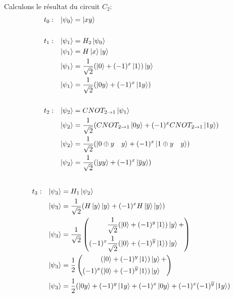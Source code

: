 \documentclass{article}
\begin{document}
Calculons le résultat du circuit $C_2$:
\begin{align*}
&t_0:&  \ket{\psi_0} &= \ket{xy} \\ \\
&t_1:&  \ket{\psi_1} &= H_2\ket{\psi_0} \\
&&      \ket{\psi_1} &= H\ket{x}\ket{y} \\
&&      \ket{\psi_1} &= \frac{1}{\sqrt{2}}(\ket{0} + (-1)^x\ket{1})\ket{y} \\
&&      \ket{\psi_1} &= \frac{1}{\sqrt{2}}(\ket{0y} + (-1)^x \ket{1y}) \\ \\
&t_2:&  \ket{\psi_2} &= CNOT_{2 \rightarrow 1}\ket{\psi_1} \\
&&      \ket{\psi_2} &= \frac{1}{\sqrt{2}}(CNOT_{2 \rightarrow 1}\ket{0y} + (-1)^xCNOT_{2 \rightarrow 1}\ket{1y}) \\
&&      \ket{\psi_2} &= \frac{1}{\sqrt{2}}(\ket{0 \oplus y \quad y} + (-1)^x\ket{1 \oplus y \quad y}) \\
&&      \ket{\psi_2} &= \frac{1}{\sqrt{2}}(\ket{yy} + (-1)^x\ket{\overline{y}y}) \\ \\
\end{align*}
\begin{align*}
&t_3:&  \ket{\psi_3} &= H_1\ket{\psi_2} \\
&&      \ket{\psi_3} &= \frac{1}{\sqrt{2}}(H\ket{y}\ket{y} + (-1)^xH\ket{\overline{y}}\ket{y}) \\
&&      \ket{\psi_3} &= \frac{1}{\sqrt{2}}\left(
        \begin{aligned}
                &\frac{1}{\sqrt{2}}(\ket{0} + (-1)^y\ket{1})\ket{y} + \\
        (-1)^x  &\frac{1}{\sqrt{2}}(\ket{0} + (-1)^{\overline{y}}\ket{1})\ket{y} \\
        \end{aligned}
    \right) \\
&&      \ket{\psi_3} &= \frac{1}{2}\left(
        \begin{aligned}
                &(\ket{0} + (-1)^y\ket{1})\ket{y} + \\
        (-1)^x  &(\ket{0} + (-1)^{\overline{y}}\ket{1})\ket{y} \\
        \end{aligned}
    \right) \\
&&      \ket{\psi_3} &= \frac{1}{2}(\ket{0y} + (-1)^y\ket{1y} + (-1)^x\ket{0y} + (-1)^x(-1)^{\overline{y}}\ket{1y}) \\
\end{align*}
\end{document}
